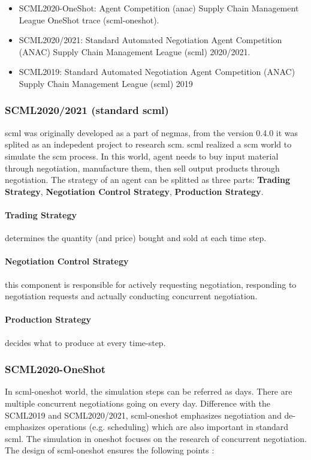 \begin{itemize}
	\item SCML2020-OneShot: Agent Competition (\gls{anac}) Supply Chain Management League OneShot trace (\gls{scml-oneshot}).
	\item SCML2020/2021: Standard Automated Negotiation Agent Competition (ANAC) Supply Chain Management League (\gls{scml}) 2020/2021.
	\item SCML2019: Standard Automated Negotiation Agent Competition (ANAC) Supply Chain Management League (\gls{scml}) 2019
\end{itemize}

\subsubsection{SCML2020/2021 (standard scml)} \label{background:scml2020}
\gls{scml} was originally developed as a part of \gls{negmas}, from the version 0.4.0 it was splited as an indepedent project to research \gls{scm}. \gls{scml} realized a \gls{scm} world to simulate the \gls{scm} process. In this world, agent needs to buy input material through negotiation, manufacture them, then sell output products through negotiation\parencite{Mohammad2021}. The strategy of an agent can be splitted as three parts: \textbf{Trading Strategy}, \textbf{Negotiation Control Strategy}, \textbf{Production Strategy}.

\paragraph{Trading Strategy} determines the quantity (and price) bought and sold at each time step.
\paragraph{Negotiation Control Strategy} this component is responsible for actively requesting negotiation, responding to negotiation requests and actually conducting concurrent negotiation.
\paragraph{Production Strategy} decides what to produce at every time-step.

\subsubsection{SCML2020-OneShot} \label{background:scml2020-oneshot}
In \gls{scml-oneshot} world, the simulation steps can be referred as days. There are multiple concurrent negotiations going on every day. Difference with the SCML2019 and SCML2020/2021, \gls{scml-oneshot} emphasizes negotiation and de-emphasizes operations (e.g. scheduling) which are also important in standard scml. The simulation in oneshot focuses on the research of concurrent negotiation. The design of \gls{scml-oneshot} ensures the following points \parencite{Mohammad2021}:

